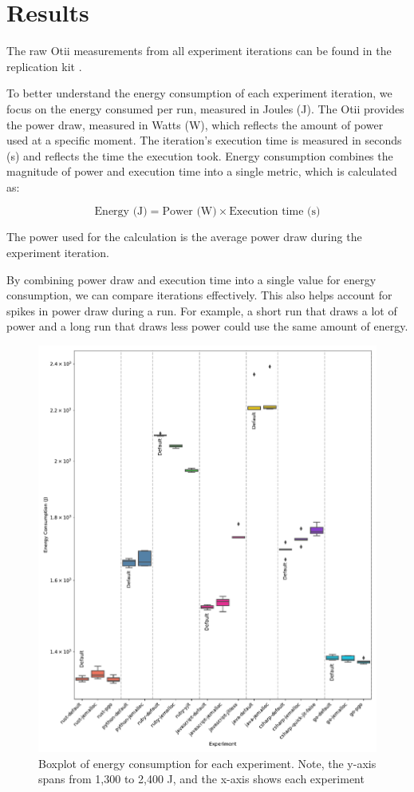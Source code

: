 \documentclass[main.tex]{subfiles}
\begin{document}
\section{Results}

The raw Otii measurements from all experiment iterations can be found in the replication kit \cite{replication-kit-Karlsen_Landsgaard_Offenberg_Pedersen_2025}.

To better understand the energy consumption of each experiment iteration, we focus on the energy consumed per run, measured in Joules (J). The Otii provides the power draw, measured in Watts (W), which reflects the amount of power used at a specific moment. The iteration's execution time is measured in seconds (s) and reflects the time the execution took. Energy consumption combines the magnitude of power and execution time into a single metric, which is calculated as:

\[
\text{Energy (J)} = \text{Power (W)} \times \text{Execution time (s)}
\]

The power used for the calculation is the average power draw during the experiment iteration.

By combining power draw and execution time into a single value for energy consumption, we can compare iterations effectively. This also helps account for spikes in power draw during a run. For example, a short run that draws a lot of power and a long run that draws less power could use the same amount of energy. 

\begin{figure}[]
    \centering
    \includegraphics[width=1\linewidth]{media/results/boxplot.pdf}
    \caption{Boxplot of energy consumption for each experiment. Note, the y-axis spans from 1,300 to 2,400 J, and the x-axis shows each experiment}
    \label{fig:boxplot}
\end{figure}
\end{document}
